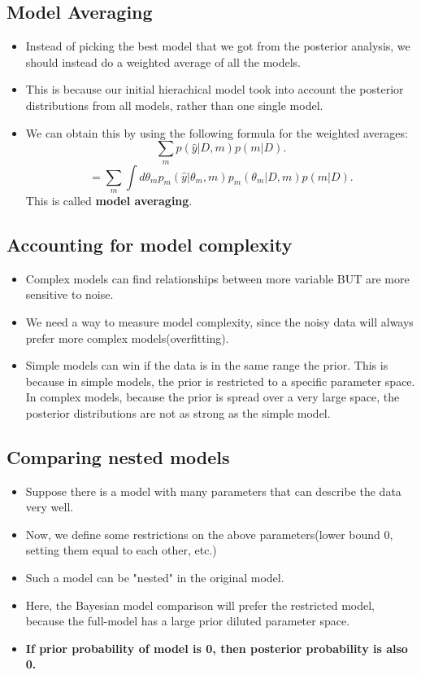 \documentclass{article}
\begin{document}
\subsection{Model Averaging}
\begin{itemize}
    \item Instead of picking the best model that we got from the posterior analysis, we should instead do a weighted average of all the models.
    \item This is because our initial hierachical model took into account the posterior distributions from all models, rather than one single model.
    \item We can obtain this by using the following formula for the weighted averages:
    \[
        \sum_{m} p(\hat{y}|D, m) p(m | D)
    .\] 
    \[
        = \sum_{m} \int d \theta_{m}p_{m}(\hat{y}|\theta_{m}, m)p_{m}(\theta_{m}|D, m) p(m|D)
    .\] 
    This is called \textbf{model averaging}.
\end{itemize}
\subsection{Accounting for model complexity}
\begin{itemize}
    \item Complex models can find relationships between more variable BUT are more sensitive to noise.
    \item We need a way to measure model complexity, since the noisy data will always prefer more complex models(overfitting).
    \item Simple models can win if the data is in the same range the prior. This is because in simple models, the prior is restricted to a specific parameter space. In complex models, because the prior is spread over a very large space, the posterior distributions are not as strong as the simple model.
\end{itemize}
\subsection{Comparing nested models}
\begin{itemize}
    \item Suppose there is a model with many parameters that can describe the data very well.
    \item Now, we define some restrictions on the above parameters(lower bound 0, setting them equal to each other, etc.)
    \item Such a model can be "nested" in the original model.
    \item Here, the Bayesian model comparison will prefer the restricted model, because the full-model has a large prior diluted parameter space.
    \item \textbf{If prior probability of model is 0, then posterior probability is also 0.}
\end{itemize}
\end{document}
